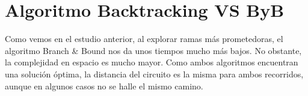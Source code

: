 \documentclass{article}
\begin{document}
	\section{Algoritmo Backtracking VS ByB}
	Como vemos en el estudio anterior, al explorar ramas más prometedoras, el algoritmo Branch \& Bound nos da unos tiempos mucho más bajos. No obstante, la complejidad en espacio es mucho mayor. Como ambos algoritmos encuentran una solución óptima, la distancia del circuito es la misma para ambos recorridos, aunque en algunos casos no se halle el mismo camino.
	
\end{document}
